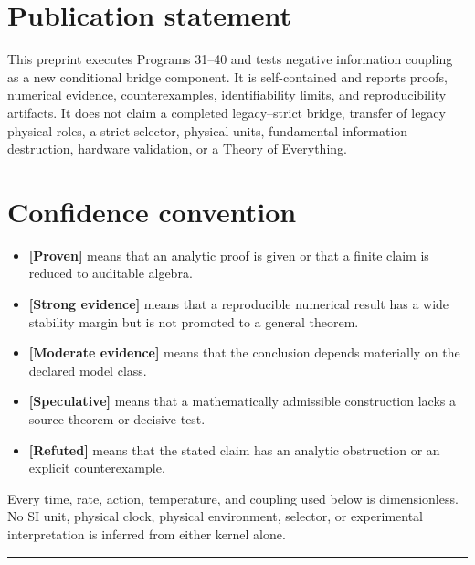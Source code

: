 \documentclass[11pt,a4paper,openany]{report}
\newcommand{\statusProven}{\textcolor{fingreen}{[Proven]}}
\newcommand{\statusStrong}{\textcolor{finblue}{[Strong evidence]}}
\newcommand{\statusModerate}{\textcolor{finviolet}{[Moderate evidence]}}
\newcommand{\statusSpeculative}{\textcolor{finorange}{[Speculative]}}
\newcommand{\statusRefuted}{\textcolor{finred}{[Refuted]}}
\begin{document}
\chapter*{Publication statement}
This preprint executes Programs 31--40 and tests negative information coupling as a new conditional bridge component. It is self-contained and reports proofs, numerical evidence, counterexamples, identifiability limits, and reproducibility artifacts. It does not claim a completed legacy--strict bridge, transfer of legacy physical roles, a strict selector, physical units, fundamental information destruction, hardware validation, or a Theory of Everything.

\tableofcontents
\clearpage
{}

\chapter*{Confidence convention}

\begin{itemize}
\item 
\textbf{\statusProven{}} means that an analytic proof is given or that a finite claim is reduced to auditable algebra.

\item 
\textbf{\statusStrong{}} means that a reproducible numerical result has a wide stability margin but is not promoted to a general theorem.

\item 
\textbf{\statusModerate{}} means that the conclusion depends materially on the declared model class.

\item 
\textbf{\statusSpeculative{}} means that a mathematically admissible construction lacks a source theorem or decisive test.

\item 
\textbf{\statusRefuted{}} means that the stated claim has an analytic obstruction or an explicit counterexample.

\end{itemize}

Every time, rate, action, temperature, and coupling used below is dimensionless. No SI unit, physical clock, physical environment, selector, or experimental interpretation is inferred from either kernel alone.

\par\medskip\hrule\medskip
\end{document}
